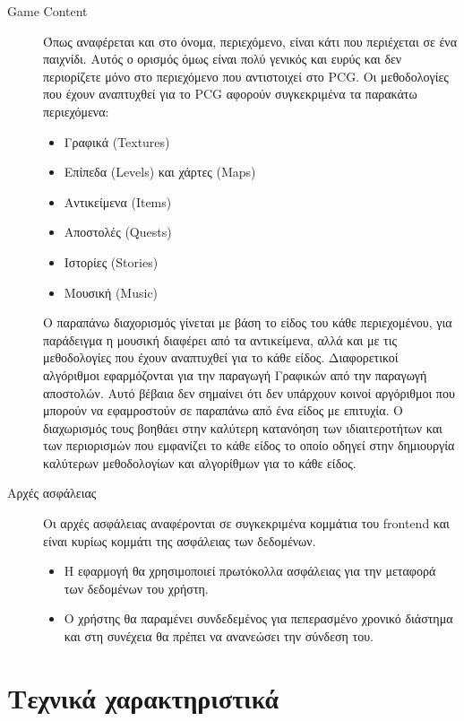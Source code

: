 \begin{description}
\item [Game Content] Όπως αναφέρεται και στο όνομα, περιεχόμενο, είναι κάτι που περιέχεται σε ένα παιχνίδι. Αυτός ο ορισμός όμως είναι πολύ γενικός και ευρύς και δεν περιορίζετε μόνο στο περιεχόμενο που αντιστοιχεί στο PCG. Οι μεθοδολογίες που έχουν αναπτυχθεί για το PCG αφορούν συγκεκριμένα τα παρακάτω περιεχόμενα: 
\newline

\begin{itemize}
  \item Γραφικά (Textures)
  \item Επίπεδα (Levels) και χάρτες (Maps)
   \item Αντικείμενα (Items)
   \item Αποστολές (Quests)
   \item Ιστορίες (Stories)
   \item Μουσική (Music)
\end{itemize}

Ο παραπάνω διαχορισμός γίνεται με βάση το είδος του κάθε περιεχομένου, για παράδειγμα η μουσική διαφέρει από τα αντικείμενα, αλλά και με τις μεθοδολογίες που έχουν αναπτυχθεί για το κάθε είδος. Διαφορετικοί αλγόριθμοι εφαρμόζονται για την παραγωγή Γραφικών από την παραγωγή αποστολών. Αυτό βέβαια δεν σημαίνει ότι δεν υπάρχουν κοινοί αργόριθμοι που μπορούν να εφαμροστούν σε παραπάνω από ένα είδος με επιτυχία. Ο διαχωρισμός τους βοηθάει στην καλύτερη κατανόηση των ιδιαιτεροτήτων και των περιορισμών που εμφανίζει το κάθε είδος το οποίο οδηγεί στην δημιουργία καλύτερων μεθοδολογίων και αλγορίθμων για το κάθε είδος.


\item [Αρχές ασφάλειας] Οι αρχές ασφάλειας αναφέρονται σε συγκεκριμένα κομμάτια του frontend και είναι κυρίως κομμάτι της ασφάλειας των δεδομένων.

\begin{itemize}
  \item Η εφαρμογή θα χρησιμοποιεί πρωτόκολλα ασφάλειας για την μεταφορά των δεδομένων του χρήστη.
  \item Ο χρήστης θα παραμένει συνδεδεμένος για πεπερασμένο χρονικό διάστημα και στη συνέχεια θα πρέπει να ανανεώσει την σύνδεση του.
\end{itemize}

\end{description}

\section{Τεχνικά χαρακτηριστικά}

